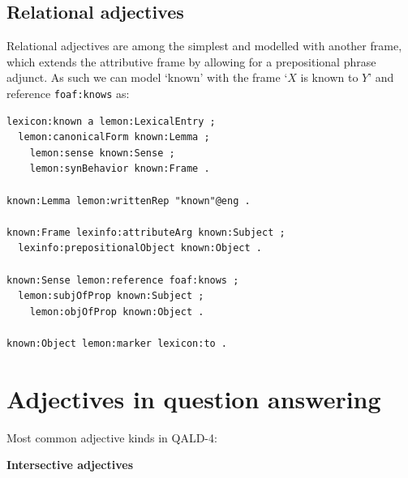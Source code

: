 \documentclass[11pt]{article}
\begin{document}
\subsection{Relational adjectives}

Relational adjectives are among the simplest and modelled with another frame,
which extends the attributive frame by allowing for a prepositional phrase
adjunct. As such we can model `known' with the frame `$X$ is known to $Y$' and
reference {\tt foaf:knows} as:

\begin{verbatim}
lexicon:known a lemon:LexicalEntry ;
  lemon:canonicalForm known:Lemma ;
	lemon:sense known:Sense ;
	lemon:synBehavior known:Frame .

known:Lemma lemon:writtenRep "known"@eng .

known:Frame lexinfo:attributeArg known:Subject ;
  lexinfo:prepositionalObject known:Object .

known:Sense lemon:reference foaf:knows ;
  lemon:subjOfProp known:Subject ;
	lemon:objOfProp known:Object .
	
known:Object lemon:marker lexicon:to .
\end{verbatim}


\section{Adjectives in question answering}

Most common adjective kinds in QALD-4:

\textbf{Intersective adjectives}
\end{document}
